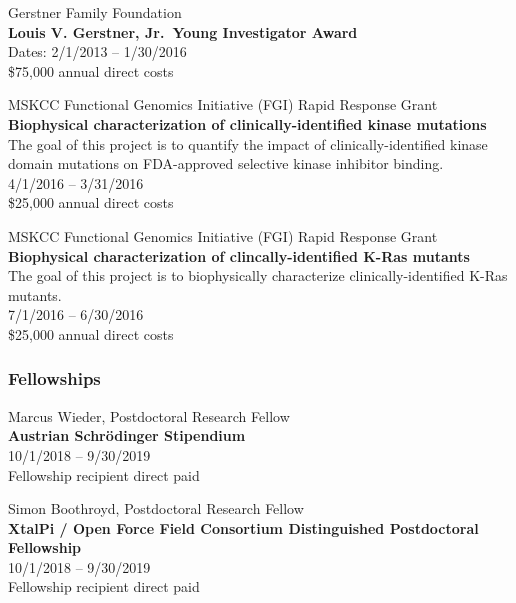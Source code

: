 \documentclass[10pt]{article}
\begin{document}
\vspace{1.5ex}

Gerstner Family Foundation \\
{\bf Louis V. Gerstner, Jr.~Young Investigator Award} \\
Dates: 2/1/2013 -- 1/30/2016 \\
\$75,000 annual direct costs

\vspace{1.5ex}

MSKCC Functional Genomics Initiative (FGI) Rapid Response Grant \\
{\bf Biophysical characterization of clinically-identified kinase mutations} \\
The goal of this project is to quantify the impact of clinically-identified kinase domain mutations on FDA-approved selective kinase inhibitor binding. \\
4/1/2016 -- 3/31/2016 \\
\$25,000 annual direct costs

\vspace{1.5ex}

MSKCC Functional Genomics Initiative (FGI) Rapid Response Grant \\
{\bf Biophysical characterization of clincally-identified K-Ras mutants} \\
The goal of this project is to biophysically characterize clinically-identified K-Ras mutants. \\
7/1/2016 -- 6/30/2016 \\
\$25,000 annual direct costs

\subsubsection*{Fellowships}

Marcus Wieder, Postdoctoral Research Fellow\\
{\bf Austrian Schr\"{o}dinger Stipendium}\\
10/1/2018 -- 9/30/2019\\
Fellowship recipient direct paid

\vspace{1.5ex}

Simon Boothroyd, Postdoctoral Research Fellow\\
{\bf XtalPi / Open Force Field Consortium Distinguished Postdoctoral Fellowship}\\
10/1/2018 -- 9/30/2019\\
Fellowship recipient direct paid
\end{document}
